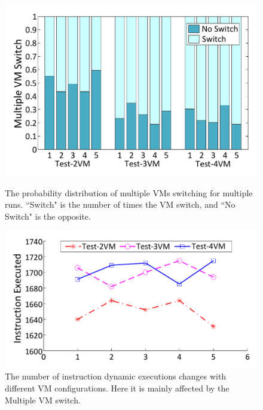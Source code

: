 \documentclass[preprint,12pt,3p]{elsarticle}
\begin{document}
\begin{figure}[t]
\centering
\begin{minipage}[t]{0.49\linewidth}
\centering
\includegraphics[width=.9\textwidth]{figure/testinfor.pdf}
\caption{The probability distribution of multiple VMs switching for multiple runs. ``Switch" is the number of times the VM switch, and ``No Switch" is the opposite.}\label{fig:Fig.testinfor}
\end{minipage}
\hspace{0.005\textwidth}
\begin{minipage}[t]{0.49\linewidth}
\centering
\includegraphics[width=.9\textwidth]{figure/testinstr.pdf}
\caption{The number of instruction dynamic executions changes with different VM configurations. Here it is mainly affected by the Multiple VM switch.} \label{fig:Fig.testinstr}
\end{minipage}
\end{figure}
\end{document}
